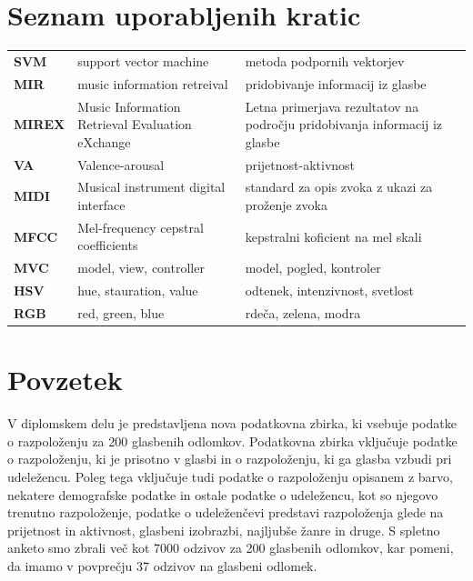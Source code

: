 \documentclass[a4paper, 12pt]{book}
\newcommand{\clearemptydoublepage}{\newpage{\pagestyle{empty}\cleardoublepage}}
\begin{document}
{%
\clearemptydoublepage

\def\thepage{}%
\tableofcontents{}


\clearemptydoublepage


\chapter*{Seznam uporabljenih kratic}

\begin{tabular}{p{2cm}|p{5.6cm}|p{5.6cm}}
  
  {\bf SVM} & support vector machine & metoda podpornih vektorjev \\
  {\bf MIR} & music information retreival & pridobivanje informacij iz glasbe \\
  {\bf MIREX} & Music Information Retrieval Evaluation eXchange & Letna primerjava rezultatov na področju pridobivanja informacij iz glasbe \\
  {\bf VA} & Valence-arousal & prijetnost-aktivnost \\ 
  {\bf MIDI} & Musical instrument digital interface & standard za opis zvoka z ukazi za proženje zvoka \\
  {\bf MFCC} & Mel-frequency cepstral coefficients & kepstralni koficient na mel skali \\
  {\bf MVC} & model, view, controller & model, pogled, kontroler \\
  {\bf HSV} & hue, stauration, value & odtenek, intenzivnost, svetlost \\
  {\bf RGB} & red, green, blue & rdeča, zelena, modra \\
  
  
  

\end{tabular}



\clearemptydoublepage

\chapter*{Povzetek}

V diplomskem delu je predstavljena nova podatkovna zbirka, ki vsebuje podatke o razpoloženju za 200 glasbenih odlomkov. Podatkovna zbirka vključuje podatke o razpoloženju, ki je prisotno v glasbi in o razpoloženju, ki ga glasba vzbudi pri udeležencu. Poleg tega vključuje tudi podatke o razpoloženju opisanem z barvo, nekatere demografske podatke in ostale podatke o udeležencu, kot so njegovo trenutno razpoloženje, podatke o udeleženčevi predstavi razpoloženja glede na prijetnost in aktivnost, glasbeni izobrazbi, najljubše žanre in druge. S spletno anketo smo zbrali več kot 7000 odzivov za 200 glasbenih odlomkov, kar pomeni, da imamo v povprečju 37 odzivov na glasbeni odlomek. 

}
\end{document}
